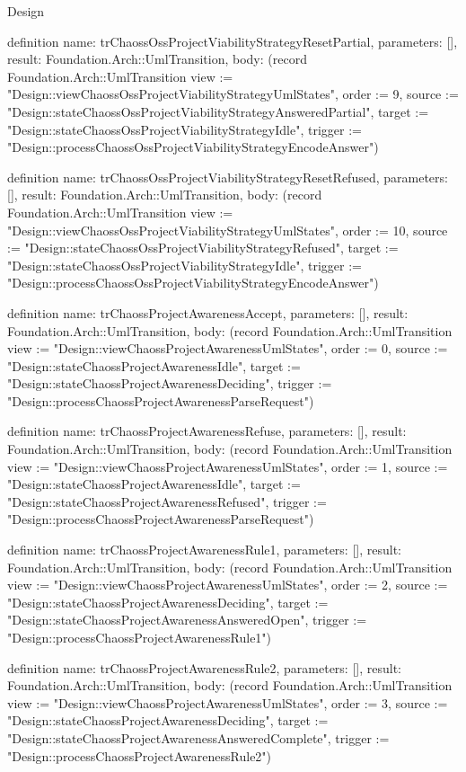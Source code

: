 \begin{lexlean}{Design}
\begin{semanticmodule}
definition{
  name: trChaossOssProjectViabilityStrategyResetPartial,
  parameters: [],
  result: Foundation.Arch::UmlTransition,
  body: (record Foundation.Arch::UmlTransition {view := "Design::viewChaossOssProjectViabilityStrategyUmlStates", order := 9, source := "Design::stateChaossOssProjectViabilityStrategyAnsweredPartial", target := "Design::stateChaossOssProjectViabilityStrategyIdle", trigger := "Design::processChaossOssProjectViabilityStrategyEncodeAnswer"})
}

definition{
  name: trChaossOssProjectViabilityStrategyResetRefused,
  parameters: [],
  result: Foundation.Arch::UmlTransition,
  body: (record Foundation.Arch::UmlTransition {view := "Design::viewChaossOssProjectViabilityStrategyUmlStates", order := 10, source := "Design::stateChaossOssProjectViabilityStrategyRefused", target := "Design::stateChaossOssProjectViabilityStrategyIdle", trigger := "Design::processChaossOssProjectViabilityStrategyEncodeAnswer"})
}

definition{
  name: trChaossProjectAwarenessAccept,
  parameters: [],
  result: Foundation.Arch::UmlTransition,
  body: (record Foundation.Arch::UmlTransition {view := "Design::viewChaossProjectAwarenessUmlStates", order := 0, source := "Design::stateChaossProjectAwarenessIdle", target := "Design::stateChaossProjectAwarenessDeciding", trigger := "Design::processChaossProjectAwarenessParseRequest"})
}

definition{
  name: trChaossProjectAwarenessRefuse,
  parameters: [],
  result: Foundation.Arch::UmlTransition,
  body: (record Foundation.Arch::UmlTransition {view := "Design::viewChaossProjectAwarenessUmlStates", order := 1, source := "Design::stateChaossProjectAwarenessIdle", target := "Design::stateChaossProjectAwarenessRefused", trigger := "Design::processChaossProjectAwarenessParseRequest"})
}

definition{
  name: trChaossProjectAwarenessRule1,
  parameters: [],
  result: Foundation.Arch::UmlTransition,
  body: (record Foundation.Arch::UmlTransition {view := "Design::viewChaossProjectAwarenessUmlStates", order := 2, source := "Design::stateChaossProjectAwarenessDeciding", target := "Design::stateChaossProjectAwarenessAnsweredOpen", trigger := "Design::processChaossProjectAwarenessRule1"})
}

definition{
  name: trChaossProjectAwarenessRule2,
  parameters: [],
  result: Foundation.Arch::UmlTransition,
  body: (record Foundation.Arch::UmlTransition {view := "Design::viewChaossProjectAwarenessUmlStates", order := 3, source := "Design::stateChaossProjectAwarenessDeciding", target := "Design::stateChaossProjectAwarenessAnsweredComplete", trigger := "Design::processChaossProjectAwarenessRule2"})
}


\end{semanticmodule}
\end{lexlean}
